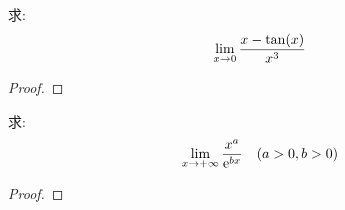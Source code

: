 \begin{example}
    求:
    \begin{equation*}
        \lim_{x \to 0 } \frac{x-\tan(x)}{x^3}
    \end{equation*}
\end{example}
\begin{proof}
    
\end{proof}

\begin{example}
    求:
    \begin{equation*}
        \lim_{x \to +\infty } \frac{x^a}{\mathrm{e}^{bx}} \quad (a > 0, b > 0)
    \end{equation*}
\end{example}
\begin{proof}
    
\end{proof}
